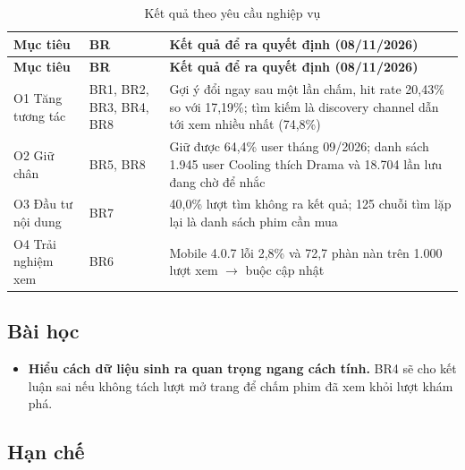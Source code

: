\documentclass[a4paper,11pt]{article}
\newlength{\reporttablewidth}
\begin{document}
\begingroup
\small
{}
\setlength{\tabcolsep}{4pt}
\renewcommand{\arraystretch}{1.18}
\setlength{\reporttablewidth}{\dimexpr\linewidth-4\tabcolsep\relax}
\begin{longtable}{@{}L{0.25\reporttablewidth} L{0.14\reporttablewidth} L{0.61\reporttablewidth}@{}}
\caption[Kết quả theo yêu cầu nghiệp vụ (mục 6.1)]{Kết quả theo yêu cầu nghiệp vụ}\label{tab:22} \\
\toprule
\textbf{Mục tiêu} & \textbf{BR} & \textbf{Kết quả để ra quyết định (08/11/2026)} \\
\midrule
\endfirsthead
\toprule
\textbf{Mục tiêu} & \textbf{BR} & \textbf{Kết quả để ra quyết định (08/11/2026)} \\
\midrule
\endhead
\midrule
\endfoot
\bottomrule
\endlastfoot
O1 Tăng tương tác & BR1, BR2, BR3, BR4, BR8 & Gợi ý đổi ngay sau một lần chấm, hit rate 20,43\% so với 17,19\%; tìm kiếm là discovery channel dẫn tới xem nhiều nhất (74,8\%) \\
O2 Giữ chân & BR5, BR8 & Giữ được 64,4\% user tháng 09/2026; danh sách 1.945 user Cooling thích Drama và 18.704 lần lưu đang chờ để nhắc \\
O3 Đầu tư nội dung & BR7 & 40,0\% lượt tìm không ra kết quả; 125 chuỗi tìm lặp lại là danh sách phim cần mua \\
O4 Trải nghiệm xem & BR6 & Mobile 4.0.7 lỗi 2,8\% và 72,7 phàn nàn trên 1.000 lượt xem \ensuremath{\rightarrow} buộc cập nhật \\
\end{longtable}
\endgroup

\subsection{Bài học}\label{sec:6.2}

\begin{itemize}
  \item \textbf{Hiểu cách dữ liệu sinh ra quan trọng ngang cách tính.} BR4 sẽ cho kết luận sai nếu không tách lượt mở trang để chấm phim đã xem khỏi lượt khám phá.
\end{itemize}

\subsection{Hạn chế}\label{sec:6.3}
\end{document}
